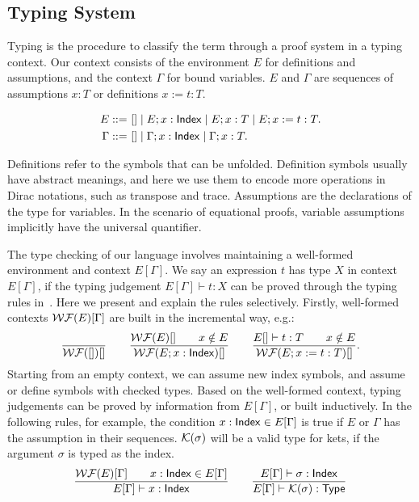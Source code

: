 \documentclass[runningheads]{llncs}
\begin{document}
\subsection{Typing System}

Typing is the procedure to classify the term through a proof system in a typing context. 
Our context consists of the environment $E$ for definitions and assumptions, and the context $\Gamma$ for bound variables. 
$E$ and $\Gamma$ are sequences of assumptions $x : T$ or definitions $x := t : T$.
\begin{definition}
    \begin{align*}
        E ::=\ & [] \mid E; x : \mathsf{Index} \mid E; x : T \mid E; x := t : T. \\
        \Gamma ::=\ & [] \mid \Gamma; x : \mathsf{Index} \mid \Gamma; x : T.
    \end{align*}
\end{definition}
Definitions refer to the symbols that can be unfolded. Definition symbols usually have abstract meanings, and here we use them to encode more operations in Dirac notations, such as transpose and trace.
Assumptions are the declarations of the type for variables. In the scenario of equational proofs, variable assumptions implicitly have the universal quantifier.

The type checking of our language involves maintaining a well-formed environment and context $E[\Gamma]$.
We say an expression $t$ has type $X$ in context $E[\Gamma]$, if the typing judgement $E[\Gamma] \vdash t : X$ can be proved through the typing rules in~. Here we present and explain the rules selectively. Firstly, well-formed contexts $\mathcal{WF}(E)[\Gamma]$ are built in the incremental way, e.g.:
\[
    \frac{}{\mathcal{WF}([])[]}
    \qquad
    \frac{\mathcal{WF}(E)[] \qquad x \notin E}{\mathcal{WF}(E; x : \mathsf{Index})[]}
    \qquad
    \frac{E[]\vdash t:T \qquad x \notin E}{\mathcal{WF}(E; x:=t:T)[]}.
\]
Starting from an empty context, we can assume new index symbols, and assume or define symbols with checked types. Based on the well-formed context, typing judgements can be proved by information from $E[\Gamma]$, or built inductively. In the following rules, for example, the condition $x : \mathsf{Index} \in E[\Gamma]$ is true if $E$ or $\Gamma$ has the assumption in their sequences. $\mathcal{K}(\sigma)$ will be a valid type for kets, if the argument $\sigma$ is typed as the index.
\begin{gather*}
    \frac{\mathcal{WF}(E)[\Gamma] \qquad x : \mathsf{Index} \in E[\Gamma]}{E[\Gamma] \vdash x : \mathsf{Index}}
    \qquad
    \frac{E[\Gamma] \vdash \sigma : \mathsf{Index}}{E[\Gamma] \vdash \mathcal{K}(\sigma) : \mathsf{Type}}
\end{gather*}
\end{document}
